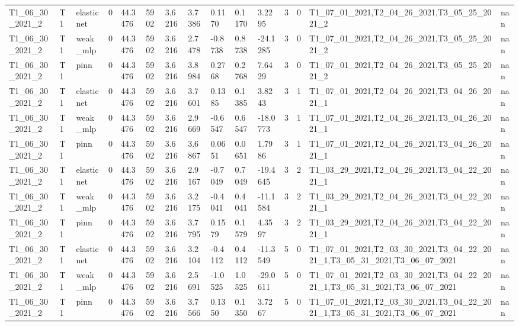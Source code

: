 \begin{table}[t]
\begin{tabular}{lllllllllllllll}
T1\_06\_30\_2021\_2 & T1 & elasticnet & 0 & 44.3476 & 5902 & 3.6216 & 3.7386 & 0.1170 & 0.1170 & 3.2295 & 3 & 0 & T1\_07\_01\_2021,T2\_04\_26\_2021,T3\_05\_25\_2021\_2 & nan \\
T1\_06\_30\_2021\_2 & T1 & weak\_mlp & 0 & 44.3476 & 5902 & 3.6216 & 2.7478 & -0.8738 & 0.8738 & -24.1285 & 3 & 0 & T1\_07\_01\_2021,T2\_04\_26\_2021,T3\_05\_25\_2021\_2 & nan \\
T1\_06\_30\_2021\_2 & T1 & pinn & 0 & 44.3476 & 5902 & 3.6216 & 3.8984 & 0.2768 & 0.2768 & 7.6429 & 3 & 0 & T1\_07\_01\_2021,T2\_04\_26\_2021,T3\_05\_25\_2021\_2 & nan \\
T1\_06\_30\_2021\_2 & T1 & elasticnet & 0 & 44.3476 & 5902 & 3.6216 & 3.7601 & 0.1385 & 0.1385 & 3.8243 & 3 & 1 & T1\_07\_01\_2021,T2\_04\_26\_2021,T3\_04\_26\_2021\_1 & nan \\
T1\_06\_30\_2021\_2 & T1 & weak\_mlp & 0 & 44.3476 & 5902 & 3.6216 & 2.9669 & -0.6547 & 0.6547 & -18.0773 & 3 & 1 & T1\_07\_01\_2021,T2\_04\_26\_2021,T3\_04\_26\_2021\_1 & nan \\
T1\_06\_30\_2021\_2 & T1 & pinn & 0 & 44.3476 & 5902 & 3.6216 & 3.6867 & 0.0651 & 0.0651 & 1.7986 & 3 & 1 & T1\_07\_01\_2021,T2\_04\_26\_2021,T3\_04\_26\_2021\_1 & nan \\
T1\_06\_30\_2021\_2 & T1 & elasticnet & 0 & 44.3476 & 5902 & 3.6216 & 2.9167 & -0.7049 & 0.7049 & -19.4645 & 3 & 2 & T1\_03\_29\_2021,T2\_04\_26\_2021,T3\_04\_22\_2021\_1 & nan \\
T1\_06\_30\_2021\_2 & T1 & weak\_mlp & 0 & 44.3476 & 5902 & 3.6216 & 3.2175 & -0.4041 & 0.4041 & -11.1584 & 3 & 2 & T1\_03\_29\_2021,T2\_04\_26\_2021,T3\_04\_22\_2021\_1 & nan \\
T1\_06\_30\_2021\_2 & T1 & pinn & 0 & 44.3476 & 5902 & 3.6216 & 3.7795 & 0.1579 & 0.1579 & 4.3597 & 3 & 2 & T1\_03\_29\_2021,T2\_04\_26\_2021,T3\_04\_22\_2021\_1 & nan \\
T1\_06\_30\_2021\_2 & T1 & elasticnet & 0 & 44.3476 & 5902 & 3.6216 & 3.2104 & -0.4112 & 0.4112 & -11.3549 & 5 & 0 & T1\_07\_01\_2021,T2\_03\_30\_2021,T3\_04\_22\_2021\_1,T3\_05\_31\_2021,T3\_06\_07\_2021 & nan \\
T1\_06\_30\_2021\_2 & T1 & weak\_mlp & 0 & 44.3476 & 5902 & 3.6216 & 2.5691 & -1.0525 & 1.0525 & -29.0611 & 5 & 0 & T1\_07\_01\_2021,T2\_03\_30\_2021,T3\_04\_22\_2021\_1,T3\_05\_31\_2021,T3\_06\_07\_2021 & nan \\
T1\_06\_30\_2021\_2 & T1 & pinn & 0 & 44.3476 & 5902 & 3.6216 & 3.7566 & 0.1350 & 0.1350 & 3.7267 & 5 & 0 & T1\_07\_01\_2021,T2\_03\_30\_2021,T3\_04\_22\_2021\_1,T3\_05\_31\_2021,T3\_06\_07\_2021 & nan \\

\end{tabular}
\end{table}
